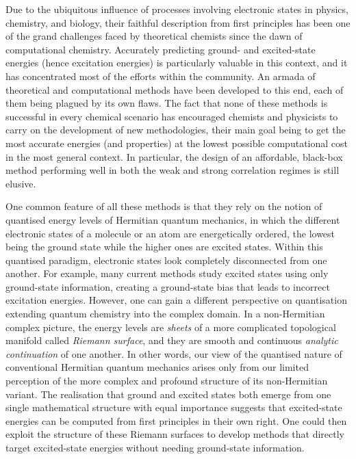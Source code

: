\documentclass[aps,prb,reprint,noshowkeys,superscriptaddress]{revtex4-1}
\begin{document}
Due to the ubiquitous influence of processes involving electronic states in physics, chemistry, and biology, their faithful description from first principles has been one of the grand challenges faced by theoretical chemists since the dawn of computational chemistry. 
Accurately predicting ground- and excited-state energies (hence excitation energies) is particularly valuable in this context, and it has concentrated most of the efforts within the community. 
An armada of theoretical and computational methods have been developed to this end, each of them being plagued by its own flaws. \cite{SzaboBook,JensenBook,CramerBook,HelgakerBook,ParrBook,FetterBook,ReiningBook}
The fact that none of these methods is successful in every chemical scenario has encouraged chemists and physicists to carry on the development of new methodologies, their main goal being to get the most accurate energies (and properties) at the lowest possible computational cost in the most general context.
In particular, the design of an affordable, black-box method performing well in both the weak and strong correlation regimes is still elusive.

One common feature of all these methods is that they rely on the notion of quantised energy levels of Hermitian quantum mechanics, in which the different electronic states of a molecule or an atom are energetically ordered, the lowest being the ground state while the higher ones are excited states. 
Within this quantised paradigm, electronic states look completely disconnected from one another.
For example, many current methods study excited states using only ground-state information, creating a ground-state bias that leads to incorrect excitation energies.\cite{Piecuch_2002,Dreuw_2005,Krylov_2006,Sneskov_2012,Gonzales_2012,Laurent_2013,Adamo_2013,Ghosh_2018,Blase_2020,Loos_2020a}
However, one can gain a different perspective on quantisation extending quantum chemistry into the complex domain.
In a non-Hermitian complex picture, the energy levels are \textit{sheets} of a more complicated topological manifold called \textit{Riemann surface}, and they are smooth and continuous \textit{analytic continuation} of one another. 
In other words, our view of the quantised nature of conventional Hermitian quantum mechanics arises only from our limited perception of the more complex and profound structure of its non-Hermitian variant. \cite{MoiseyevBook,BenderPTBook}
The realisation that ground and excited states both emerge from one single mathematical structure with equal importance suggests that excited-state energies can be computed from first principles in their own right. 
One could then exploit the structure of these Riemann surfaces to develop methods that directly target excited-state energies without needing ground-state information. \cite{Burton_2019,Burton_2019a}
\end{document}
